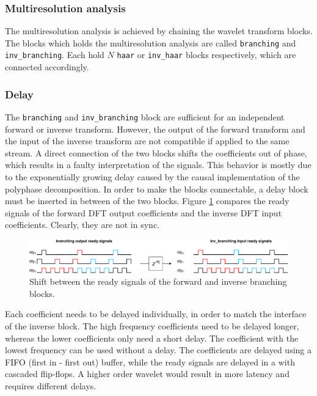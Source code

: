 \begin{refsection}
\subsubsection{Multiresolution analysis}

The multiresolution analysis is achieved by chaining the wavelet transform blocks.
The blocks which holds the multiresolution analysis are called \texttt{branching} and \texttt{inv\_branching}.
Each hold $N$ \texttt{haar} or \texttt{inv\_haar} blocks respectively, which are connected accordingly.

\subsubsection{Delay \label{fpga:sec:delay}}

The \texttt{branching} and \texttt{inv\_branching} block are sufficient for an independent forward or inverse transform.
However, the output of the forward transform and the input of the inverse transform are not compatible if applied to the same stream.
A direct connection of the two blocks shifts the coefficients out of phase, which results in a faulty interpretation of the signals.
This behavior is mostly due to the exponentially growing delay caused by the causal implementation of the polyphase decomposition.
In order to make the blocks connectable, a delay block must be inserted in between of the two blocks.
Figure \ref{fpga:fig:delay} compares the ready signals of the forward DFT output coefficients and the inverse DFT input coefficients.
Clearly, they are not in sync.
\begin{figure}
	\centering
	\includegraphics[width=\hsize]{papers/fpga/images/delay.pdf}
	\caption{
		Shift between the ready signals of the forward and inverse branching blocks.
	}
	\label{fpga:fig:delay}
\end{figure}
Each coefficient needs to be delayed individually, in order to match the interface of the inverse block.
The high frequency coefficients need to be delayed longer, whereas the lower coefficients only need a short delay.
The coefficient with the lowest frequency can be used without a delay.
The coefficients are delayed using a FIFO (first in - first out) buffer, while the ready signals are delayed in a with cascaded flip-flops.
A higher order wavelet would result in more latency and requires different delays. 


\end{refsection}
